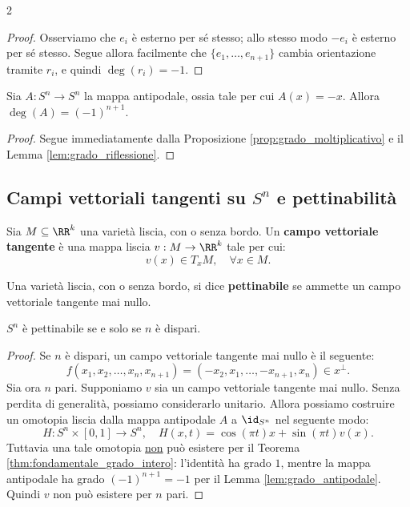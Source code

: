 \begin{multicols*}{2}
\begin{proof}
        Osserviamo che $e_i$ è esterno per sé stesso; allo stesso modo $-e_i$ è esterno per sé stesso.
        Segue allora facilmente che $\{e_1, \ldots, e_{n+1}\}$ cambia orientazione tramite $r_i$,
        e quindi $\deg(r_i) = -1$.
    \end{proof}

    \begin{lemma} \label{lem:grado_antipodale}
        Sia $A : S^n \to S^n$ la mappa antipodale, ossia tale per cui $A(x) = -x$.
        Allora $\deg(A) = (-1)^{n+1}$.
    \end{lemma}

    \begin{proof}
        Segue immediatamente dalla Proposizione \ref{prop:grado_moltiplicativo} e il Lemma \ref{lem:grado_riflessione}.
    \end{proof}

    \subsection{Campi vettoriali tangenti su \texorpdfstring{$S^n$}{Sⁿ} e pettinabilità}

    \begin{definition}
        Sia $M \subseteq \RR^k$ una varietà liscia, con o senza bordo. Un
        \textbf{campo vettoriale tangente} è una mappa liscia
        $v : M \to \RR^k$ tale per cui:
        \[
            \boxed{v(x) \in T_x M, \quad \forall x \in M.}
        \]
    \end{definition}

    \begin{definition}[Pettinabilità]
        Una varietà liscia, con o senza bordo, si dice \textbf{pettinabile}
        se ammette un campo vettoriale tangente mai nullo.
    \end{definition}

    \begin{theorem} \label{thm:pettinabilità_sfera}
        $S^n$ è pettinabile se e solo se $n$ è dispari.
    \end{theorem}

    \begin{proof}
        Se $n$ è dispari, un campo vettoriale tangente mai nullo è il seguente:
        \[
            f(x_1, x_2, \ldots, x_n, x_{n+1}) = (-x_2, x_1, \ldots, -x_{n+1}, x_n) \in x^\perp.
        \]
        Sia ora $n$ pari.
        Supponiamo $v$ sia un campo vettoriale tangente mai nullo. Senza
        perdita di generalità, possiamo considerarlo unitario. Allora
        possiamo costruire un omotopia liscia dalla mappa
        antipodale $A$ a $\id_{S^n}$ nel seguente modo:
        \[
            H : S^n \times [0, 1] \to S^n, \quad H(x, t) = \cos(\pi t) x + \sin(\pi t) v(x).
        \]
        Tuttavia una tale omotopia \underline{non} può esistere per
        il Teorema \ref{thm:fondamentale_grado_intero}: l'identità
        ha grado $1$, mentre la mappa antipodale ha grado $(-1)^{n+1} = -1$ per
        il Lemma \ref{lem:grado_antipodale}. Quindi $v$ non può esistere per $n$ pari.
    \end{proof}


\end{multicols*}

